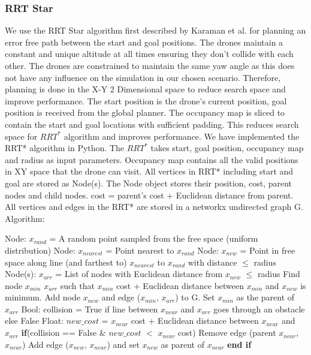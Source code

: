 \subsubsection{RRT Star}
We use the RRT Star algorithm first described by Karaman et al.\cite{karaman2011sampling} for planning an error free path between the start and goal positions.
The drones maintain a constant and unique altitude at all times ensuring they don't collide with each other.
The drones are constrained to maintain the same yaw angle as this does not have any influence on the simulation in our chosen scenario.
Therefore, planning is done in the X-Y 2 Dimensional space to reduce search space and improve performance.
The start position is the drone's current position, goal position is received from the global planner.
The occupancy map is sliced to contain the start and goal locations with sufficient padding.
This reduces search space for $RRT^*$ algorithm and improves performance.
We have implemented the RRT* algorithm in Python.
The $RRT^*$ takes start, goal position, occupancy map and radius as input parameters.
Occupancy map contains all the valid positions in XY space that the drone can visit.
All vertices in RRT* including start and goal are stored as Node(s).
The Node object stores their position, cost, parent nodes and child nodes.
cost = parent's cost + Euclidean distance from parent.
All vertices and edges in the RRT* are stored in a networkx\cite{SciPyProceedings_11} undirected graph G.
Algorithm:
\begin{algorithmic}[1]
    \State Node: $x_{rand}$ = A random point sampled from the free space (uniform distribution)
    \State Node: $x_{nearest}$ = Point nearest to $x_{rand}$
    \State Node: $x_{new}$ = Point in free space along line (and farthest to) $x_{nearest}$ to $x_{rand}$ with distance $\leq$ radius
    \State Node(s): $x_{arr}$ = List of nodes with Euclidean distance from $x_{new}$ $\leq$ radius
    \State Find node $x_{min}$ \in $x_{arr}$ such that $x_{min}$ cost + Euclidean distance between $x_{min}$ and $x_{new}$ is minimum.
    \State Add node $x_{new}$ and edge ($x_{min}$, $x_{arr}$) to G. Set $x_{min}$ as the parent of $x_{arr}$
    \State Bool: collision = True if line between $x_{near}$ and $x_{arr}$ goes through an obstacle else False
    \State Float: $new\_cost$ = $x_{near}$ cost + Euclidean distance between $x_{near}$ and $x_{arr}$
    \State \textbf{if}(collision == False $\&$ $new\_cost$ $<$ $x_{near}$ cost)
    \State\hspace{\algorithmicindent} Remove edge (parent $x_{near}$, $x_{near}$)
    \State\hspace{\algorithmicindent} Add edge ($x_{new}$, $x_{near}$) and set $x_{new}$ as parent of $x_{near}$
    \State \textbf{end if}
    \EndFor
\end{algorithmic}